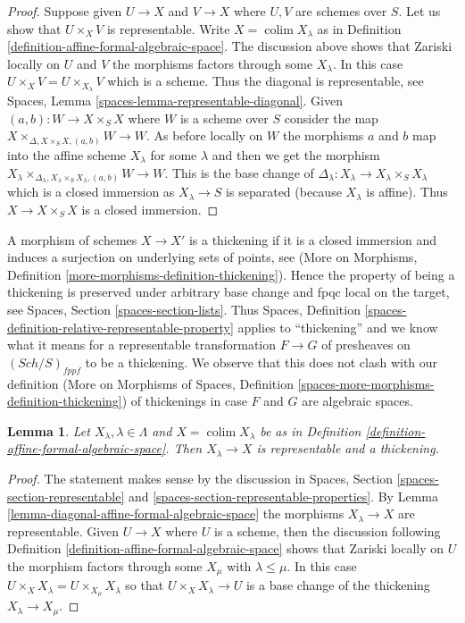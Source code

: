\documentclass{stacks-project}
\theoremstyle{plain}
\newtheorem{lemma}[subsection]{Lemma}
\theoremstyle{definition}
\theoremstyle{remark}
\numberwithin{equation}{subsection}
\def\colim{\mathop{\mathrm{colim}}\nolimits}
\def\Sch{\mathit{Sch}}
\begin{document}
\begin{proof}
Suppose given $U \to X$ and $V \to X$ where $U, V$ are schemes over $S$.
Let us show that $U \times_X V$ is representable. Write $X = \colim X_\lambda$
as in Definition \ref{definition-affine-formal-algebraic-space}.
The discussion above shows that Zariski locally on $U$ and $V$ the morphisms
factors through some $X_\lambda$. In this case
$U \times_X V = U \times_{X_\lambda} V$ which is a scheme.
Thus the diagonal is representable, see
Spaces, Lemma \ref{spaces-lemma-representable-diagonal}.
Given $(a, b) : W \to X \times_S X$ where $W$ is a scheme over $S$
consider the map $X \times_{\Delta, X \times_S X, (a, b)} W \to W$.
As before locally on $W$ the morphisms $a$ and $b$ map into
the affine scheme $X_\lambda$ for some $\lambda$ and then
we get the morphism
$X_\lambda
\times_{\Delta_\lambda, X_\lambda \times_S X_\lambda, (a, b)} W \to W$.
This is the base change of
$\Delta_\lambda : X_\lambda \to X_\lambda \times_S X_\lambda$
which is a closed immersion as $X_\lambda \to S$ is separated
(because $X_\lambda$ is affine).
Thus $X \to X \times_S X$ is a closed immersion.
\end{proof}

\noindent
A morphism of schemes $X \to X'$ is a thickening if it is a closed immersion
and induces a surjection on underlying sets of points, see
(More on Morphisms, Definition
\ref{more-morphisms-definition-thickening}).
Hence the property of being a thickening is preserved under arbitrary
base change and fpqc local on the target, see
Spaces, Section \ref{spaces-section-lists}.
Thus Spaces, Definition \ref{spaces-definition-relative-representable-property}
applies to ``thickening'' and we know what it means for a
representable transformation $F \to G$ of
presheaves on $(\Sch/S)_{fppf}$ to be a thickening.
We observe that this does not clash with our definition
(More on Morphisms of Spaces, Definition
\ref{spaces-more-morphisms-definition-thickening})
of thickenings in case $F$ and $G$ are algebraic spaces.

\begin{lemma}
\label{lemma-covering-by-thickenings}
Let $X_\lambda, \lambda \in \Lambda$ and $X = \colim X_\lambda$
be as in Definition \ref{definition-affine-formal-algebraic-space}.
Then $X_\lambda \to X$ is representable and a thickening.
\end{lemma}

\begin{proof}
The statement makes sense by the discussion in
Spaces, Section \ref{spaces-section-representable} and
\ref{spaces-section-representable-properties}.
By Lemma \ref{lemma-diagonal-affine-formal-algebraic-space}
the morphisms $X_\lambda \to X$ are representable.
Given $U \to X$ where $U$ is a scheme,
then the discussion following
Definition \ref{definition-affine-formal-algebraic-space}
shows that Zariski locally on $U$ the
morphism factors through some $X_\mu$ with $\lambda \leq \mu$.
In this case $U \times_X X_\lambda = U \times_{X_\mu} X_\lambda$
so that $U \times_X X_\lambda \to U$ is a base change of
the thickening $X_\lambda \to X_\mu$.
\end{proof}
\end{document}
